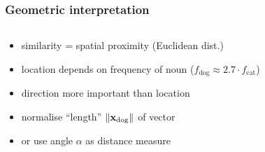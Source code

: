\documentclass[t]{beamer} %
\begin{document}
\begin{frame}
  \frametitle{Geometric interpretation}

  \begin{columns}[T]
    \begin{column}{40mm}
      \begin{itemize}
      \item similarity = spatial proximity (Euclidean dist.)
      \item location depends on frequency of noun ($f_{\text{dog}} \approx 2.7\cdot f_{\text{cat}}$)
      \item direction more important than location
      \item<1-> normalise ``length'' $\norm{\vx_{\text{dog}}}$ of vector
      \item<2-> or use angle $\alpha$ as distance measure
      \end{itemize}
    \end{column}
    \begin{column}{75mm}
      \ungap[1]
    \end{column}
  \end{columns}
\end{frame}
\end{document}
